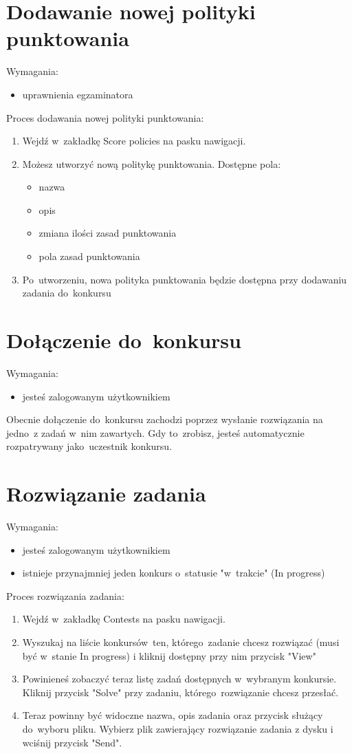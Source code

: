 \documentclass{article}
\begin{document}
\section{Dodawanie nowej polityki punktowania}
Wymagania:
\begin{itemize}
	\item uprawnienia egzaminatora
\end{itemize}
Proces dodawania nowej polityki punktowania:
\begin{enumerate}
	\item Wejdź w~zakładkę Score policies na pasku nawigacji.
	\item Możesz utworzyć nową politykę punktowania. Dostępne pola:
	\begin{itemize}
		\item nazwa
		\item opis
		\item zmiana ilości zasad punktowania
		\item pola zasad punktowania
	\end{itemize}
	\item Po~utworzeniu, nowa polityka punktowania będzie dostępna przy dodawaniu zadania do~konkursu
\end{enumerate}

\section{Dołączenie do~konkursu}
Wymagania:
\begin{itemize}
	\item jesteś zalogowanym użytkownikiem
\end{itemize}
Obecnie dołączenie do~konkursu zachodzi poprzez wysłanie rozwiązania na jedno~z zadań w~nim zawartych. Gdy to~zrobisz, jesteś automatycznie rozpatrywany jako~uczestnik konkursu.

\section{Rozwiązanie zadania}
Wymagania:
\begin{itemize}
	\item jesteś zalogowanym użytkownikiem
	\item istnieje przynajmniej jeden konkurs o~statusie "w~trakcie" (In progress)
\end{itemize}
Proces rozwiązania zadania:
\begin{enumerate}
	\item Wejdź w~zakładkę Contests na pasku nawigacji.
	\item Wyszukaj na liście konkursów~ten, którego~zadanie chcesz rozwiązać (musi być w~stanie In progress) i kliknij dostępny przy nim przycisk "View"
	\item Powinieneś zobaczyć teraz listę zadań dostępnych w~wybranym konkursie. Kliknij przycisk "Solve" przy zadaniu, którego~rozwiązanie chcesz przesłać.
	\item Teraz powinny być widoczne nazwa, opis zadania oraz przycisk służący do~wyboru pliku. Wybierz plik zawierający rozwiązanie zadania z dysku i wciśnij przycisk "Send".
\end{enumerate}
\end{document}
